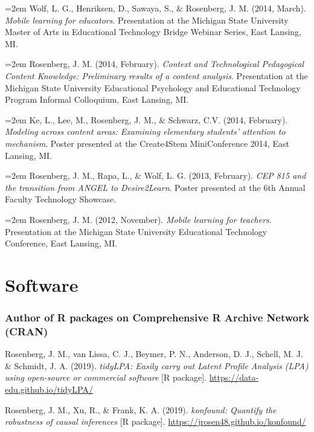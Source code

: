 \documentclass[
  14,
]{article}
\begin{document}
\hangindent=2em Wolf, L. G., Henriksen, D., Sawaya, S., \& Rosenberg, J.
M. (2014, March). \emph{Mobile learning for educators}. Presentation at
the Michigan State University Master of Arts in Educational Technology
Bridge Webinar Series, East Lansing, MI.

\hangindent=2em Rosenberg, J. M. (2014, February). \emph{Context and
Technological Pedagogical Content Knowledge: Preliminary results of a
content analysis}. Presentation at the Michigan State University
Educational Psychology and Educational Technology Program Informal
Colloquium, East Lansing, MI.

\hangindent=2em Ke, L., Lee, M., Rosenberg, J. M., \& Schwarz, C.V.
(2014, February). \emph{Modeling across content areas: Examining
elementary students' attention to mechanism}. Poster presented at the
Create4Stem MiniConference 2014, East Lansing, MI.

\hangindent=2em Rosenberg, J. M., Rapa, L., \& Wolf, L. G. (2013,
February). \emph{CEP 815 and the transition from ANGEL to Desire2Learn}.
Poster presented at the 6th Annual Faculty Technology Showcase.

\hangindent=2em Rosenberg, J. M. (2012, November). \emph{Mobile learning
for teachers}. Presentation at the Michigan State University Educational
Technology Conference, East Lansing, MI.

\hypertarget{software}{%
\section{Software}\label{software}}

\hypertarget{author-of-r-packages-on-comprehensive-r-archive-network-cran}{%
\subsubsection{Author of R packages on Comprehensive R Archive Network
(CRAN)}\label{author-of-r-packages-on-comprehensive-r-archive-network-cran}}

Rosenberg, J. M., van Lissa, C. J., Beymer, P. N., Anderson, D. J.,
Schell, M. J. \& Schmidt, J. A. (2019). \emph{tidyLPA: Easily carry out
Latent Profile Analysis (LPA) using open-source or commercial software}
{[}R package{]}. \url{https://data-edu.github.io/tidyLPA/}

Rosenberg, J. M., Xu, R., \& Frank, K. A. (2019). \emph{konfound:
Quantify the robustness of causal inferences} {[}R package{]}.
\url{https://jrosen48.github.io/konfound/}
\end{document}
